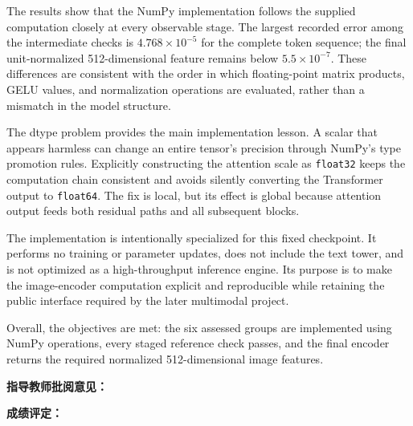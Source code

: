 \documentclass[a4paper,12pt]{article}
\begin{document}
The results show that the NumPy implementation follows the supplied computation
closely at every observable stage. The largest recorded error among the
intermediate checks is \(4.768\times10^{-5}\) for the complete token sequence;
the final unit-normalized 512-dimensional feature remains below
\(5.5\times10^{-7}\). These differences are consistent with the order in which
floating-point matrix products, GELU values, and normalization operations are
evaluated, rather than a mismatch in the model structure.

The dtype problem provides the main implementation lesson. A scalar that
appears harmless can change an entire tensor's precision through NumPy's type
promotion rules. Explicitly constructing the attention scale as
\texttt{float32} keeps the computation chain consistent and avoids silently
converting the Transformer output to \texttt{float64}. The fix is local, but
its effect is global because attention output feeds both residual paths and all
subsequent blocks.

The implementation is intentionally specialized for this fixed checkpoint.
It performs no training or parameter updates, does not include the text tower,
and is not optimized as a high-throughput inference engine. Its purpose is to
make the image-encoder computation explicit and reproducible while retaining
the public interface required by the later multimodal project.

Overall, the objectives are met: the six assessed groups are implemented using
NumPy operations, every staged reference check passes, and the final encoder
returns the required normalized 512-dimensional image features.

\newpage


\vspace{1cm}

\noindent \textbf{指导教师批阅意见：}
\vspace{6cm}
\hfill

\vspace{1cm}

\noindent \textbf{成绩评定：}
\vspace{2cm}
\hfill
\end{document}
